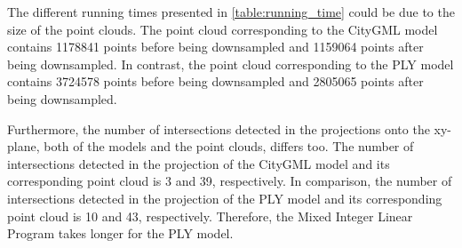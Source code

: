         The different running times presented in \autoref{table:running_time} could be due to the size of the point clouds. 
        The point cloud corresponding to the CityGML model contains 1178841 points before being downsampled and 1159064 points after being downsampled.
        In contrast, the point cloud corresponding to the PLY model contains 3724578 points before being downsampled and 2805065 points after being downsampled.

        Furthermore, the number of intersections detected in the projections onto the xy-plane, both of the models and the point clouds, differs too.
        The number of intersections detected in the projection of the CityGML model and its corresponding point cloud is 3 and 39, respectively. 
        In comparison, the number of intersections detected in the projection of the PLY model and its corresponding point cloud is 10 and 43, respectively.
        Therefore, the Mixed Integer Linear Program takes longer for the PLY model.
        
        




        

    

